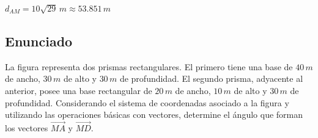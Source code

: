 \documentclass[12pt, a4paper]{article}
\begin{document}
\begin{tcolorbox}[colback=green!5!white, colframe=green!50!black, title=Respuesta Final]
\centering \Large $d_{AM} = 10\sqrt{29} \, \si{m} \approx 53.851 \, \si{m}$
\end{tcolorbox}

\newpage

\subsection*{Enunciado}
La figura representa dos prismas rectangulares. El primero tiene una base de $40 \, \si{m}$ de ancho, $30 \, \si{m}$ de alto y $30 \, \si{m}$ de profundidad. El segundo prisma, adyacente al anterior, posee una base rectangular de $20 \, \si{m}$ de ancho, $10 \, \si{m}$ de alto y $30 \, \si{m}$ de profundidad. Considerando el sistema de coordenadas asociado a la figura y utilizando las operaciones básicas con vectores, determine el ángulo que forman los vectores $\vec{MA}$ y $\vec{MD}$.
\end{document}
